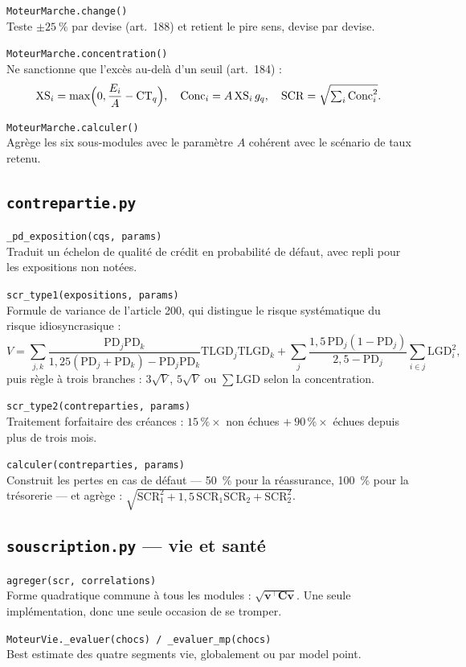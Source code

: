 \documentclass[10pt,a4paper]{article}
\newcommand{\fn}[2]{\par\smallskip\textcolor{bleufonce}{\texttt{#1}}\\ #2\par}
\newcommand{\art}[1]{\textcolor{gris}{\small (art.~#1)}}
\begin{document}
\fn{MoteurMarche.change()}{Teste $\pm\qty{25}{\percent}$ par devise \art{188} et retient le pire
sens, devise par devise.}

\fn{MoteurMarche.concentration()}{Ne sanctionne que l'excès au-delà d'un seuil \art{184} :
\[
\mathrm{XS}_i = \max\Bigl(0, \frac{E_i}{A}-\mathrm{CT}_q\Bigr),\quad
\mathrm{Conc}_i = A\,\mathrm{XS}_i\,g_q,\quad
\mathrm{SCR} = \sqrt{\textstyle\sum_i \mathrm{Conc}_i^2}.
\]}

\fn{MoteurMarche.calculer()}{Agrège les six sous-modules avec le paramètre $A$ cohérent avec le
scénario de taux retenu.}

\subsection{\texttt{contrepartie.py}}

\fn{\_pd\_exposition(cqs, params)}{Traduit un échelon de qualité de crédit en probabilité de
défaut, avec repli pour les expositions non notées.}

\fn{scr\_type1(expositions, params)}{Formule de variance de l'article 200, qui distingue le
risque systématique du risque idiosyncrasique :
\[
V = \sum_{j,k}\frac{\mathrm{PD}_j\mathrm{PD}_k}{1{,}25(\mathrm{PD}_j+\mathrm{PD}_k)-\mathrm{PD}_j\mathrm{PD}_k}
\mathrm{TLGD}_j\mathrm{TLGD}_k
+ \sum_j \frac{1{,}5\,\mathrm{PD}_j(1-\mathrm{PD}_j)}{2{,}5-\mathrm{PD}_j}\sum_{i\in j}\mathrm{LGD}_i^2,
\]
puis règle à trois branches : $3\sqrt V$, $5\sqrt V$ ou $\sum \mathrm{LGD}$ selon la
concentration.}

\fn{scr\_type2(contreparties, params)}{Traitement forfaitaire des créances :
$15\,\% \times$ non échues $+\ 90\,\% \times$ échues depuis plus de trois mois.}

\fn{calculer(contreparties, params)}{Construit les pertes en cas de défaut — \qty{50}{\percent}
pour la réassurance, \qty{100}{\percent} pour la trésorerie — et agrège :
$\sqrt{\mathrm{SCR}_1^2 + 1{,}5\,\mathrm{SCR}_1\mathrm{SCR}_2 + \mathrm{SCR}_2^2}$.}

\subsection{\texttt{souscription.py} — vie et santé}

\fn{agreger(scr, correlations)}{Forme quadratique commune à tous les modules :
$\sqrt{\mathbf v^{\top}\mathbf C \mathbf v}$. Une seule implémentation, donc une seule occasion
de se tromper.}

\fn{MoteurVie.\_evaluer(chocs) / \_evaluer\_mp(chocs)}{Best estimate des quatre segments vie,
globalement ou par model point.}
\end{document}
